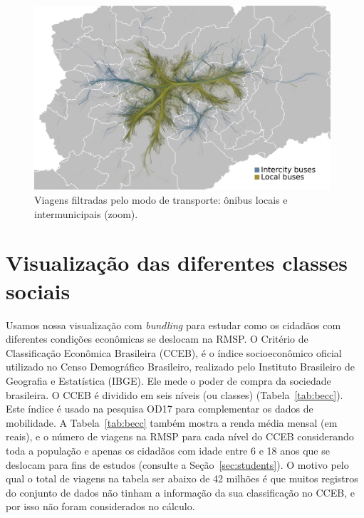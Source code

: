 \begin{figure}[!htb]
  \centering
  \captionsetup{justification=centering}
  \includegraphics[width=0.98\textwidth]{../figuras/local-intercity-buses}
  \caption{Viagens filtradas pelo modo de transporte: ônibus locais e intermunicipais (zoom). \label{fig:bus-integration-zoom}}
\end{figure}

\section{Visualização das diferentes classes sociais}
\label{sec:strata}

Usamos nossa visualização com \emph{bundling} para estudar como os cidadãos com diferentes
condições econômicas se deslocam na RMSP. O Critério de Classificação Econômica
Brasileira (CCEB), \citep{cceb2008} é o índice socioeconômico oficial utilizado no Censo
Demográfico Brasileiro, realizado pelo Instituto Brasileiro de Geografia e
Estatística (IBGE). Ele mede o poder de compra da sociedade brasileira. O CCEB é
dividido em seis níveis (ou classes) (Tabela~\ref{tab:becc}). Este índice é usado na pesquisa
OD17 para complementar os dados de mobilidade. A Tabela~\ref{tab:becc} também mostra a renda
média mensal (em reais), e o número de viagens na RMSP para cada nível do CCEB considerando toda a população e apenas
os cidadãos com idade entre 6 e 18 anos que se deslocam para fins de estudos (consulte a
Seção~\ref{sec:students}). O motivo pelo qual o total de viagens na tabela ser abaixo de 42 milhões
é que muitos registros do conjunto de dados não tinham a informação da sua classificação no CCEB, e por isso
não foram considerados no cálculo.

